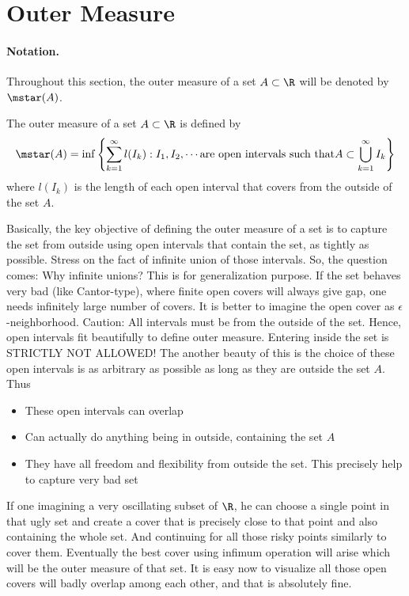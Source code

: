 \section{Outer Measure}
\paragraph{Notation.}
Throughout this section, the outer measure of a set $A \subset \R$ will be denoted by $\mstar(A)$.
\begin{definition}
    The outer measure of a set $A \subset \R$ is defined by
    \[
    \mstar(A)=\inf\left\{\sum_{k=1}^\infty l(I_k) : I_1, I_2,\cdots \text{are open intervals such that} A \subset \bigcup_{k=1}^\infty I_k \right\}
    \]
    where $l(I_k)$ is the length of each open interval that covers from the outside of the set $A$. 
\end{definition}
\begin{concept}
    Basically, the key objective of defining the outer measure of a set is to capture the set from outside using open intervals that contain the set, as tightly as possible. Stress on the fact of infinite union of those intervals. So, the question comes: Why infinite unions? This is for generalization purpose. If the set behaves very bad (like Cantor-type), where finite open covers will always give gap, one needs infinitely large number of covers. It is better to imagine the open cover as $\epsilon$-neighborhood. Caution: All intervals must be from the outside of the set. Hence, open intervals fit beautifully to define outer measure. Entering inside the set is STRICTLY NOT ALLOWED! The another beauty of this is the choice of these open intervals is as arbitrary as possible as long as they are outside the set $A$. Thus
    \begin{itemize}
        \item These open intervals can overlap
        \item Can actually do anything being in outside, containing the set $A$
        \item They have all freedom and flexibility from outside the set. This precisely help to capture very bad set
    \end{itemize}
    If one imagining a very oscillating subset of $\R$, he can choose a single point in that ugly set and create a cover that is precisely close to that point and also containing the whole set. And continuing for all those risky points similarly to cover them. Eventually the best cover using infimum operation will arise which will be the outer measure of that set. It is easy now to visualize all those open covers will badly overlap among each other, and that is absolutely fine.  
\end{concept}
